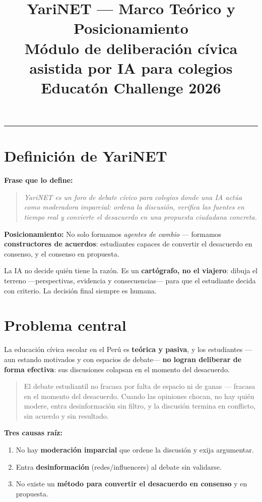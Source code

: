 \documentclass[11pt,a4paper]{article}
\title{\textbf{YariNET --- Marco Te\'orico y Posicionamiento}\\[2pt]
\large M\'odulo de deliberaci\'on c\'ivica asistida por IA para colegios\\
Educat\'on Challenge 2026}
\author{}
\date{}
\begin{document}
\maketitle
\vspace{-1.2cm}
\begin{center}\rule{\textwidth}{0.4pt}\end{center}

\section{Definici\'on de YariNET}

\noindent\textbf{Frase que lo define:}
\begin{quote}
\textit{YariNET es un foro de debate c\'ivico para colegios donde una IA act\'ua como moderadora imparcial: ordena la discusi\'on, verifica las fuentes en tiempo real y convierte el desacuerdo en una propuesta ciudadana concreta.}
\end{quote}

\noindent\textbf{Posicionamiento:} No solo formamos \textit{agentes de cambio} --- formamos \textbf{constructores de acuerdos}: estudiantes capaces de convertir el desacuerdo en consenso, y el consenso en propuesta.

\medskip
\noindent La IA no decide qui\'en tiene la raz\'on. Es un \textbf{cart\'ografo, no el viajero}: dibuja el terreno ---perspectivas, evidencia y consecuencias--- para que el estudiante decida con criterio. La decisi\'on final siempre es humana.

\section{Problema central}

La educaci\'on c\'ivica escolar en el Per\'u es \textbf{te\'orica y pasiva}, y los estudiantes ---aun estando motivados y con espacios de debate--- \textbf{no logran deliberar de forma efectiva}: sus discusiones colapsan en el momento del desacuerdo.

\begin{quote}
El debate estudiantil no fracasa por falta de espacio ni de ganas --- fracasa en el momento del desacuerdo. Cuando las opiniones chocan, no hay qui\'en modere, entra desinformaci\'on sin filtro, y la discusi\'on termina en conflicto, sin acuerdo y sin resultado.
\end{quote}

\noindent\textbf{Tres causas ra\'iz:}
\begin{enumerate}[leftmargin=*]
  \item No hay \textbf{moderaci\'on imparcial} que ordene la discusi\'on y exija argumentar.
  \item Entra \textbf{desinformaci\'on} (redes/influencers) al debate sin validarse.
  \item No existe un \textbf{m\'etodo para convertir el desacuerdo en consenso} y en propuesta.
\end{enumerate}
\end{document}
